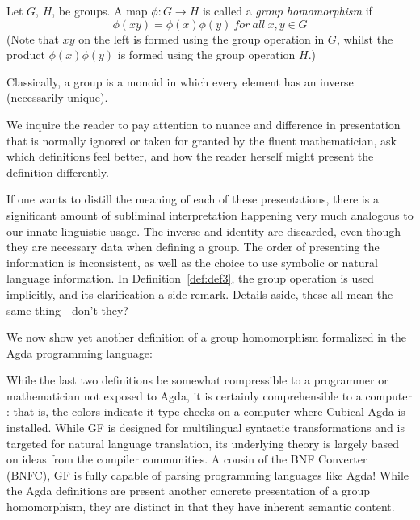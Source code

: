 
\begin{definition}\label{def:def3}
Let $G$, $H$, be groups.  A map $\phi : G \to H$ is called a \emph{group homomorphism} if
  $$\phi(xy) = \phi ( x ) \phi ( y )\ for\ all\ x, y \in G$$ 
(Note that $xy$ on the left is formed using the group operation in $G$, whilst the product $\phi ( x ) \phi ( y )$ is formed using the group operation $H$.)
\end{definition}


\begin{definition}\label{def:def4}
Classically, a group is a monoid in which every element has an inverse (necessarily unique).
\end{definition}

We inquire the reader to pay attention to nuance and difference in presentation
that is normally ignored or taken for granted by the fluent mathematician, ask
which definitions feel better, and how the reader herself might present the
definition differently.

If one wants to distill the meaning of each of these presentations, there is a
significant amount of subliminal interpretation happening very much analogous to
our innate linguistic usage. The inverse and identity are discarded, even though
they are necessary data when defining a group. The order of presenting the
information is inconsistent, as well as the choice to use symbolic or natural
language information. In Definition~\ref{def:def3}, the group operation is used
implicitly, and its clarification a side remark. Details aside, these all mean
the same thing - don't they?


We now show yet another definition of a group homomorphism formalized in the
Agda programming language:



While the last two definitions be somewhat compressible to a programmer
or mathematician not exposed to Agda, it is certainly comprehensible to a
computer : that is, the colors indicate it type-checks on a computer where Cubical Agda is installed.
While GF is designed for multilingual syntactic transformations and is targeted
for natural language translation, its underlying theory is largely based on
ideas from the compiler communities. A cousin of the BNF Converter (BNFC), GF is
fully capable of parsing programming languages like Agda! While the Agda
definitions are present another concrete presentation of a group
homomorphism, they are distinct in that they have inherent semantic content.

